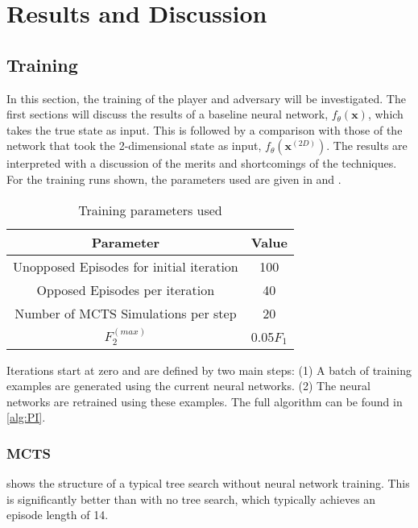 \documentclass[../main.tex]{subfiles}
\begin{document}
\onlyinsubfile{\tableofcontents{}}

\chapter{Results and Discussion}

\section{Training}

In this section, the training of the player and adversary will be investigated. The first sections will discuss the results of a baseline neural network, $f_{\theta}(\boldsymbol{x})$, which takes the true state as input. This is followed by a comparison with those of the network that took the 2-dimensional state as input, $f_{\theta}(\boldsymbol{x}^{(2D)})$. The results are interpreted with a discussion of the merits and shortcomings of the techniques. For the training runs shown, the parameters used are given in  and .

\begin{table}[h]
    \centering
    \begin{tabular}{c | c}
        Parameter & Value \\
        \hline
        Unopposed Episodes for initial iteration &  100\\
        Opposed Episodes per iteration &  40\\
        Number of MCTS Simulations per step & 20 \\
        $F_2^{(max)}$  &  0.05$F_1$
    \end{tabular}
    \caption{Training parameters used}
    \label{tab:tparams}
\end{table}

Iterations start at zero and are defined by two main steps: (1) A batch of training examples are generated using the current neural networks. (2) The neural networks are retrained using these examples. The full algorithm can be found in \cref{alg:PI}.

\subsection{MCTS}
\label{sec:dismcts}

 shows the structure of a typical tree search without neural network training. This is significantly better than with no tree search, which typically achieves an episode length of 14.
\end{document}
